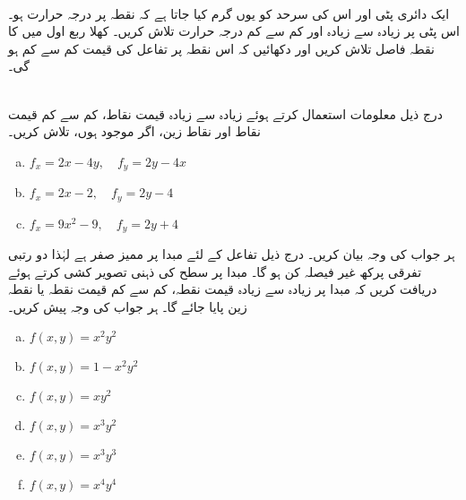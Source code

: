 \\
ایک دائری پٹی   اور اس کی سرحد  کو یوں گرم کیا جاتا ہے کہ نقطہ  پر درجہ حرارت  ہو۔اس پٹی پر زیادہ سے زیادہ اور کم سے کم درجہ حرارت  تلاش کریں۔
کھلا  ربع اول  میں   کا نقطہ  فاصل تلاش کریں اور دکھائیں کہ اس نقطہ پر تفاعل کی قیمت کم سے کم ہو گی۔

\\
درج ذیل معلومات استعمال کرتے ہوئے    زیادہ سے زیادہ قیمت  نقاط، کم سے کم قیمت  نقاط اور نقاط زین، اگر موجود ہوں، تلاش کریں۔
\begin{enumerate}[a.]
\item
$f_x=2x-4y,\quad f_y=2y-4x$
\item
$f_x=2x-2,\quad f_y=2y-4$
\item
$f_x=9x^2-9,\quad f_y=2y+4$
\end{enumerate}
ہر جواب کی وجہ بیان کریں۔
درج ذیل تفاعل کے لئے مبدا پر ممیز    صفر ہے لہٰذا دو رتبی تفرقی پرکھ غیر  فیصلہ کن ہو گا۔ مبدا پر سطح  کی ذہنی  تصویر کشی کرتے ہوئے  دریافت کریں کہ مبدا پر زیادہ سے زیادہ قیمت  نقطہ، کم سے کم قیمت  نقطہ یا نقطہ زین پایا جائے گا۔  ہر جواب کی وجہ پیش کریں۔
\begin{multicols}{2}
\begin{enumerate}[a.]
\item
$f(x,y)=x^2y^2$
\item
$f(x,y)=1-x^2y^2$
\item
$f(x,y)=xy^2$
\item
$f(x,y)=x^3y^2$
\item
$f(x,y)=x^3y^3$
\item
$f(x,y)=x^4y^4$
\end{enumerate}
\end{multicols}

